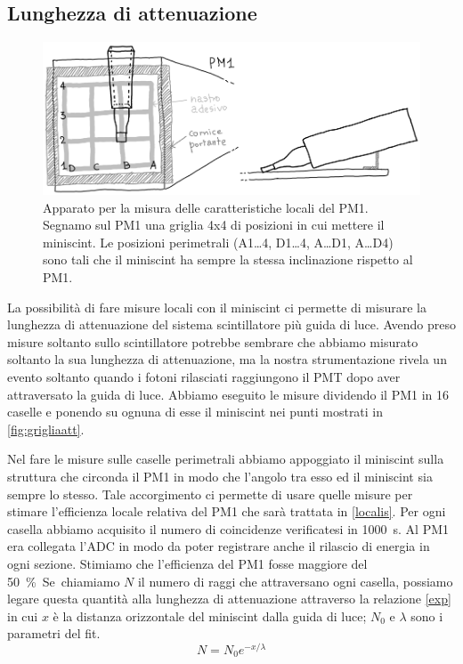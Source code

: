 \subsection{Lunghezza di attenuazione}
\label{attenu}

\begin{figure}
	\centering
	\includegraphics[width=\textwidth]{grigliaatt}
	\caption{\label{fig:grigliaatt}
	Apparato per la misura delle caratteristiche locali del PM1.
	Segnamo sul PM1 una griglia 4x4 di posizioni in cui mettere il miniscint.
	Le posizioni perimetrali (A1\dots4, D1\dots4, A\dots D1, A\dots D4)
	sono tali che il miniscint ha sempre la stessa inclinazione rispetto al PM1.}
\end{figure}

La possibilità di fare misure locali con il miniscint 
ci permette di misurare la lunghezza di attenuazione del sistema scintillatore più guida di luce. Avendo preso misure soltanto sullo scintillatore potrebbe sembrare che abbiamo misurato soltanto la sua lunghezza di attenuazione, ma la nostra strumentazione rivela un evento soltanto quando i fotoni rilasciati raggiungono il PMT dopo aver attraversato la guida di luce. 
Abbiamo eseguito le misure dividendo il PM1 in 16 caselle e ponendo su ognuna di esse il miniscint nei punti mostrati in \autoref{fig:grigliaatt}. 

Nel fare le misure sulle caselle perimetrali abbiamo appoggiato il miniscint sulla struttura che circonda il PM1 in modo che l'angolo tra esso ed il miniscint sia sempre lo stesso. Tale accorgimento ci permette di usare quelle misure per stimare l'efficienza locale relativa del PM1 che sarà trattata in \autoref{localis}.
Per ogni casella abbiamo acquisito il numero di coincidenze verificatesi in \SI{1000}{s}.
Al PM1 era collegata l'ADC in modo da poter registrare anche il rilascio di energia in ogni sezione.
Stimiamo che l'efficienza del PM1 fosse maggiore del \SI{50}\%.

Se chiamiamo $N$ il numero di raggi che attraversano ogni casella, possiamo legare questa quantità alla lunghezza di attenuazione attraverso la relazione \eqref{exp} in cui $x$ è la distanza orizzontale del miniscint dalla guida di luce; $N_0$ e $\lambda$ sono i parametri del fit. 
\begin{equation}
N=N_0 e^{-x/\lambda}  \label{exp}
\end{equation}

